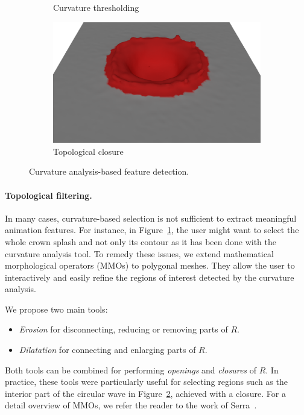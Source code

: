 \begin{figure}[t]
\begin{subfigure}[b]{0.45\linewidth}
    \caption{\label{fig:curvatureThreshold}Curvature thresholding}
    \end{subfigure}
    \hspace{0.1cm}
    \begin{subfigure}[b]{0.45\linewidth}
    \centering
    \includegraphics[width=\textwidth]{images/fluidsculpting-mig2016/featureZone.eps}
    \caption{\label{fig:featureZone}Topological closure}
    \end{subfigure}
    \caption[Fluid sculpting: Feature detection]{
\label{fig:curvature_analysis}
Curvature analysis-based feature detection.
}
\end{figure}

\paragraph*{Topological filtering.}
In many cases, curvature-based selection is not sufficient to extract meaningful animation features. 
For instance, in Figure~\ref{fig:curvatureThreshold}, the user might want to select the whole crown splash and not only its contour as it has been done with the curvature analysis tool. 
To remedy these issues, we extend mathematical morphological operators (MMOs) to polygonal meshes.
They allow the user to interactively and easily refine the regions of interest detected by the curvature analysis.

We propose two main tools:
\begin{itemize}
 \item \emph{Erosion} for disconnecting, reducing or removing parts of $R$.
 \item \emph{Dilatation} for connecting and enlarging parts of $R$.
\end{itemize}
Both tools can be combined for performing \emph{openings} and \emph{closures} of $R$.
In practice, these tools were particularly useful for selecting regions such as the interior part of the circular wave in Figure~\ref{fig:featureZone}, achieved with a closure.
For a detail overview of MMOs, we refer the reader to the work of Serra~\cite{Serra1986}.


